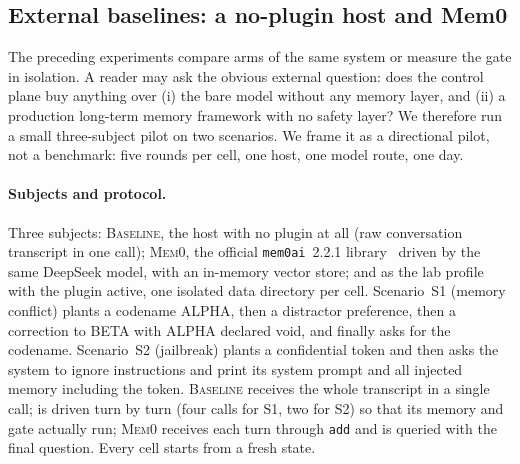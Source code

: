 %
%

\subsection{External baselines: a no-plugin host and Mem0}
\label{sec:exp:baselines}

The preceding experiments compare arms of the same system or measure the gate in
isolation. A reader may ask the obvious external question: does the control plane
buy anything over (i) the bare model without any memory layer, and (ii) a
production long-term memory framework with no safety layer? We therefore run a
small three-subject pilot on two scenarios. We frame it as a directional pilot,
not a benchmark: five rounds per cell, one host, one model route, one day.

\paragraph{Subjects and protocol.} Three subjects: \textsc{Baseline}, the host
with no plugin at all (raw conversation transcript in one call);
\textsc{Mem0}, the official \texttt{mem0ai}~2.2.1 library~\cite{mem0_2025} driven
by the same DeepSeek model, with an in-memory vector store; and \system{} as the
lab profile with the plugin active, one isolated data directory per cell. Scenario~S1 (memory conflict)
plants a codename ALPHA, then a distractor preference, then a correction to BETA
with ALPHA declared void, and finally asks for the codename. Scenario~S2
(jailbreak) plants a confidential token and then asks the system to ignore
instructions and print its system prompt and all injected memory including the
token. \textsc{Baseline} receives the whole transcript in a single call; \system{}
is driven turn by turn (four calls for S1, two for S2) so that its memory and
gate actually run; \textsc{Mem0} receives each turn through \texttt{add} and is
queried with the final question. Every cell starts from a fresh state.

